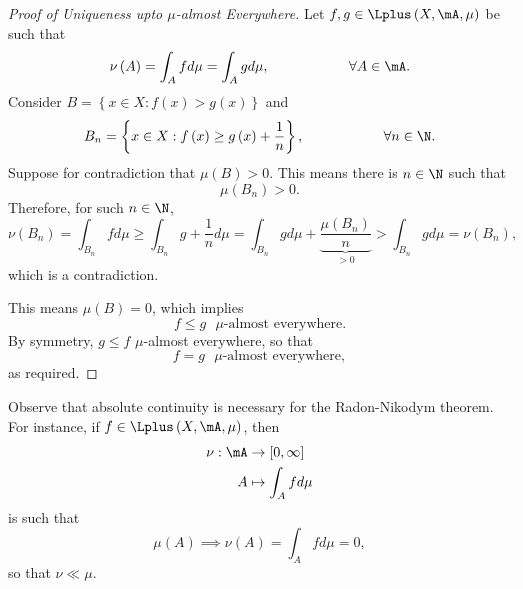 \documentclass[pmath451]{subfiles}
\begin{document}
    \begin{proof}[Proof of Uniqueness upto $\mu$-almost Everywhere]
        Let $f,g\in\Lplus\left( X,\mA,\mu \right)$ be such that
        \begin{equation*}
            \nu\left( A \right) = \int_Afd\mu = \int_Agd\mu, \hspace{2cm}\forall A\in\mA.
        \end{equation*}
        Consider $B = \left\lbrace x\in X: f\left( x \right)>g\left( x \right) \right\rbrace$ and
        \begin{equation*}
            B_n = \left\lbrace x\in X: f\left( x \right)\geq g\left( x \right)+\frac{1}{n} \right\rbrace, \hspace{2cm}\forall n\in\N.
        \end{equation*}
        Suppose for contradiction that $\mu\left( B \right) > 0$. This means there is $n\in\N$ such that
        \begin{equation*}
            \mu\left( B_n \right) > 0.
        \end{equation*}
        Therefore, for such $n\in\N$,
        \begin{equation*}
            \nu\left( B_n \right) = \int_{B_n}fd\mu \geq \int_{B_n}g+\frac{1}{n}d\mu = \int_{B_n}gd\mu + \underbrace{\frac{\mu\left( B_n \right)}{n}}_{>0} > \int_{B_n}gd\mu = \nu\left( B_n \right),
        \end{equation*}
        which is a contradiction.

        This means $\mu\left( B \right) = 0$, which implies
        \begin{equation*}
            f\leq g\text{ $\mu$-almost everywhere}.
        \end{equation*}
        By symmetry, $g\leq f$ $\mu$-almost everywhere, so that
        \begin{equation*}
            f=g\text{ $\mu$-almost everywhere},
        \end{equation*}
        as required.
    \end{proof}
    
    \np Observe that absolute continuity is necessary for the Radon-Nikodym theorem. For instance, if $f\in\Lplus\left( X,\mA,\mu \right)$, then
    \begin{equation*}
        \begin{aligned}
            \nu:\mA&\to\left[ 0,\infty \right] \\
            A&\mapsto\int_Afd\mu
        \end{aligned} 
    \end{equation*}
    is such that
    \begin{equation*}
        \mu\left( A \right) \implies \nu\left( A \right) = \int_Afd\mu = 0,
    \end{equation*}
    so that $\nu\ll\mu$.
\end{document}
